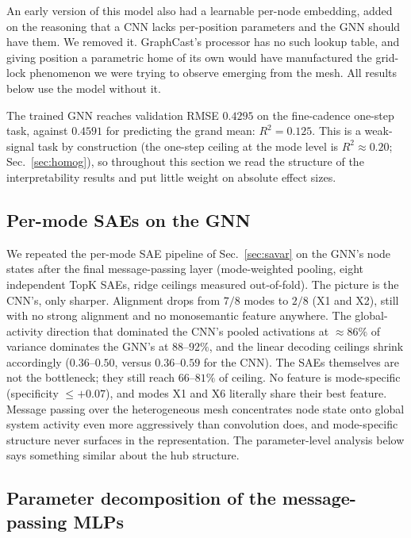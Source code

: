 An early version of this model also had a learnable per-node embedding, added on
the reasoning that a CNN lacks per-position parameters and the GNN should have
them. We removed it. GraphCast's processor has no such lookup table, and giving
position a parametric home of its own would have manufactured the grid-lock
phenomenon we were trying to observe emerging from the mesh. All results below use
the model without it.

The trained GNN reaches validation RMSE $0.4295$ on the fine-cadence one-step
task, against $0.4591$ for predicting the grand mean: $R^2 = 0.125$. This is a
weak-signal task by construction (the one-step ceiling at the mode level is
$R^2 \approx 0.20$; Sec.~\ref{sec:homog}), so throughout this section we read the
structure of the interpretability results and put little weight on absolute effect
sizes.

\subsection{Per-mode SAEs on the GNN}
\label{sec:gnn-sae}

We repeated the per-mode SAE pipeline of Sec.~\ref{sec:savar} on the GNN's node
states after the final message-passing layer (mode-weighted pooling, eight
independent TopK SAEs, ridge ceilings measured out-of-fold). The picture is the
CNN's, only sharper. Alignment drops from $7/8$ modes to $2/8$ (X1 and X2), still
with no strong alignment and no monosemantic feature anywhere. The global-activity
direction that dominated the CNN's pooled activations at ${\approx}86\%$ of
variance dominates the GNN's at $88$--$92\%$, and the linear decoding ceilings
shrink accordingly ($0.36$--$0.50$, versus $0.36$--$0.59$ for the CNN). The SAEs
themselves are not the bottleneck; they still reach $66$--$81\%$ of ceiling. No
feature is mode-specific (specificity $\le +0.07$), and modes X1 and X6 literally
share their best feature. Message passing over the heterogeneous mesh concentrates
node state onto global system activity even more aggressively than convolution
does, and mode-specific structure never surfaces in the representation. The
parameter-level analysis below says something similar about the hub structure.

\subsection{Parameter decomposition of the message-passing MLPs}
\label{sec:vpd}

